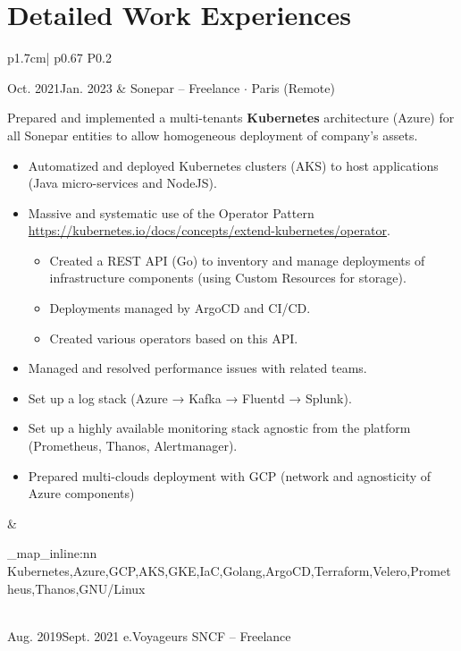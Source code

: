 \documentclass[darkhipster]{hipstercv}
\newcommand{\cvsection}[1] {%
    \section*{\textbf{#1}}
}%
\newcommand{\cvtags}[1] {
    \clist_map_inline:nn { #1 }
    {
        \cvtag{##1} %
    }
}
\newcommand{\cveventdetailed}[9]{
    {\small #1} &
    {#2 $\cdot$ \small{{#4 ~\faMapMarker}}}\vspace{.5em}\newline
    {\color{black!70}\footnotesize #5\vspace{#9}} &
    {\raisebox{-0.7\height}{\texttt{[image: \#6]}}} \vspace{#7}
    {\par \small \cvtags{#8}}
}
\begin{document}



\cvsection{Detailed Work Experiences}
\begin{longtable}{p{1.7cm}| p{} P{0.2\textwidth}}
    \cveventdetailed
        {Oct. 2021\newline Jan. 2023}
        {Sonepar -- Freelance}
        {SRE/Architect}
        {Paris (Remote)\color{cvred}}
        {
            Prepared and implemented a multi-tenants {\bfseries Kubernetes} architecture (Azure) for all Sonepar entities to allow homogeneous deployment of company's assets.
            \begin{itemize}
                \item Automatized and deployed Kubernetes clusters (AKS) to host applications (Java micro-services and NodeJS).
                \item Massive and systematic use of the Operator Pattern \url{https://kubernetes.io/docs/concepts/extend-kubernetes/operator}.
                \begin{itemize}
                    \item Created a REST API (Go) to inventory and manage deployments of infrastructure components (using Custom Resources for storage).
                    \item Deployments managed by ArgoCD and CI/CD.
                    \item Created various operators based on this API.
                \end{itemize}
                \item Managed and resolved performance issues with related teams.
                \item Set up a log stack (Azure → Kafka → Fluentd → Splunk).
                \item Set up a highly available monitoring stack agnostic from the platform (Prometheus, Thanos, Alertmanager).
                \item Prepared multi-clouds deployment with GCP (network and agnosticity of Azure components)
            \end{itemize}
        }
        {images/sonepar.png}{0.5em}{Kubernetes,Azure,GCP,AKS,GKE,IaC,Golang,ArgoCD,Terraform,Velero,Prometheus,Thanos,GNU/Linux}
        {.3em} \\
    \cveventdetailed
        {Aug. 2019\newline Sept. 2021}
        {e.Voyageurs SNCF -- Freelance}

\end{longtable}
\end{document}
